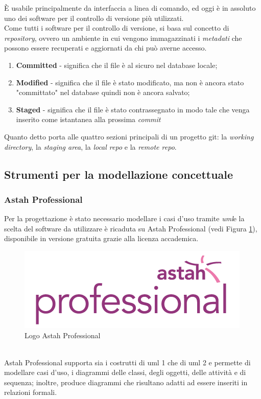 È usabile principalmente da interfaccia a linea di comando, ed oggi è in assoluto uno dei software per il controllo di versione più utilizzati.\\
Come tutti i software per il controllo di versione, si basa sul concetto di \emph{\gls{repository}}\glsfirstoccur\cite{gitSite}, ovvero un ambiente in cui vengono immagazzinati i \emph{\gls{metadati}}\glsfirstoccur\cite{gitGuida} che possono essere recuperati e aggiornati da chi può averne accesso.
\begin{enumerate}
	\item \textbf{Committed} - significa che il file è al sicuro nel database locale;
	\item \textbf{Modified} - significa che il file è stato modificato, ma non è ancora stato "committato" nel database quindi non è ancora salvato;
	\item \textbf{Staged} - significa che il file è stato contrassegnato in modo tale che venga inserito come istantanea alla prossima \emph{\gls{commit}}\glsfirstoccur
\end{enumerate}
Quanto detto porta alle quattro sezioni principali di un progetto \gls{git}: la \textit{working directory}, la \textit{staging area}, la \textit{local repo} e la \textit{remote repo}.

\subsection{Strumenti per la modellazione concettuale}
\subsubsection{Astah Professional}
Per la progettazione è stato necessario modellare i casi d'uso tramite \emph{\gls{uml}}\glsfirstoccur e la scelta del software da utilizzare è ricaduta su Astah Professional (vedi Figura \ref{img:astah}), disponibile in versione gratuita grazie alla licenza accademica.
\begin{figure}[h]
	\centering
	\includegraphics[scale=1]{immagini/astah}
	\caption{Logo Astah Professional}
	\label{img:astah}
\end{figure}
\\
Astah Professional supporta sia i costrutti di \gls{uml} 1 che di \gls{uml} 2 e permette di modellare casi d’uso, i diagrammi delle classi, degli oggetti, delle attività e di sequenza; inoltre, produce diagrammi che risultano adatti ad essere inseriti in relazioni formali.

